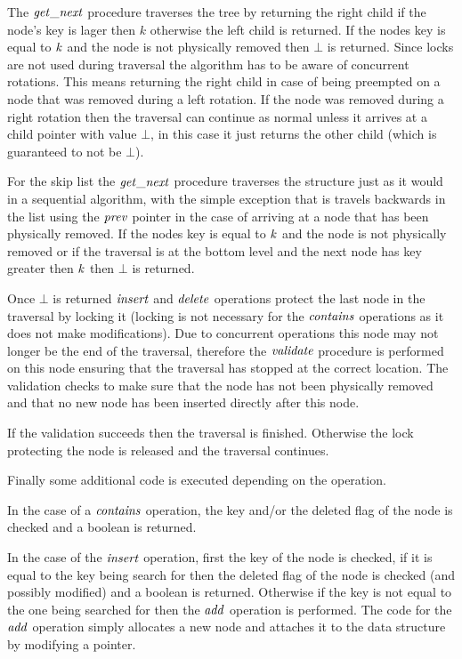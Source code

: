 The $\ms{get\_next}$ procedure traverses the tree by returning the right child if the node's key is lager then $k$
otherwise the left child is returned.
If the nodes key is equal to $\ms{k}$ and the node is not physically removed then $\bot$ is returned.
Since locks are not used during traversal the algorithm has to be aware of concurrent rotations.
This means returning the right child in case of being preempted on a node that was removed during a left rotation.
If the node was removed during a right rotation then the traversal can continue as normal unless it arrives at a
child pointer with value $\bot$, in this case it just returns the other child (which is guaranteed to not be $\bot$).

For the skip list the $\ms{get\_next}$ procedure traverses the structure just as it would in a sequential
algorithm, with the simple exception that is travels backwards in the list using the $\ms{prev}$ pointer
in the case of arriving at a node that has been physically removed.
If the nodes key is equal to $\ms{k}$ and the node is not physically removed or if the traversal
is at the bottom level and the next node has key greater then $\ms{k}$ then $\bot$ is returned.

Once $\bot$ is returned $\ms{insert}$ and $\ms{delete}$ operations protect the last node in the traversal by locking it (locking is not necessary for the $\ms{contains}$ operations as
it does not make modifications).
Due to concurrent operations this node may not longer be the end of the traversal, therefore the $\ms{validate}$ procedure is performed on this node
ensuring that the traversal has stopped at the correct location.
The validation checks to make sure that the node has not been physically removed and that no new node has been inserted directly after this node.

If the validation succeeds then the traversal is finished.
Otherwise the lock protecting the node
is released and the traversal continues.

Finally some additional code is executed depending on the operation.

In the case of a $\ms{contains}$ operation, the key and/or the deleted flag of the node is checked and a boolean is returned.

In the case of the $\ms{insert}$ operation, first the key of the node is checked, if it is equal to the key being search for then
the deleted flag of the node is checked (and possibly modified) and a boolean is returned.
Otherwise if the key is not equal to the one being searched for then the $\ms{add}$ operation is performed.
The code for the $\ms{add}$ operation simply allocates a new node and attaches
it to the data structure by modifying a pointer.

